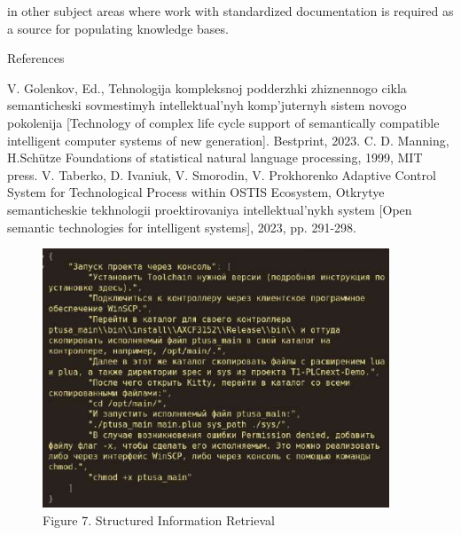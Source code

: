 \documentclass[11pt,final]{article}
\begin{document}
\begin{multicols}{2}
        \vspace{1em}

        {\noindent in other subject areas where work with standardized documentation is required as a source for populating knowledge bases.}

        \vspace{-0.3em}
    
        \begin{center}
            References
        \end{center}
        
        \vspace{-3.4em}
        
        \renewcommand{\refname}{}
        \scriptsize\begin{thebibliography}{3} 
            \setlength{\parskip}{-3.5pt}
             V. Golenkov, Ed., Tehnologija kompleksnoj podderzhki zhiznennogo cikla semanticheski sovmestimyh intellektual’nyh komp’juternyh sistem novogo pokolenija [Technology of complex life cycle support of semantically compatible intelligent computer systems of new generation]. Bestprint, 2023.
             C. D. Manning, H.Schütze Foundations of statistical natural language processing, 1999, MIT press.
             V. Taberko, D. Ivaniuk, V. Smorodin, V. Prokhorenko Adaptive Control System for Technological Process within OSTIS Ecosystem, Otkrytye semanticheskie tekhnologii proektirovaniya intellektual’nykh system [Open semantic technologies for intelligent systems], 2023, pp. 291-298.
        \end{thebibliography}

        \columnbreak
        
        \begin{figure}[H]
            \centering
            \includegraphics[width=1.0135\linewidth]{5_mat.jpg}
            \label{fig:enter-label}
            {\scriptsize Figure 7. Structured Information Retrieval}
        \end{figure}


\end{multicols}
\end{document}
